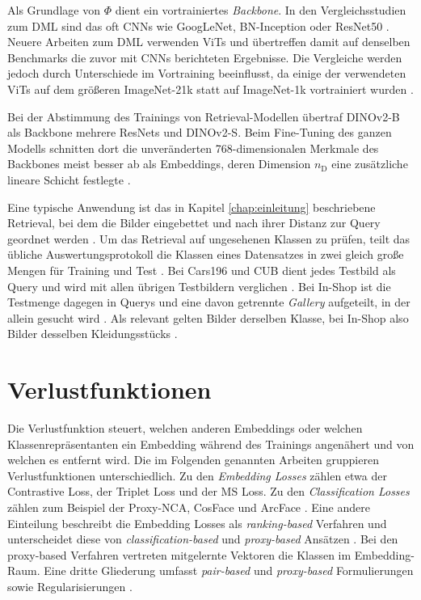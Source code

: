 Als Grundlage von $\Phi$ dient ein vortrainiertes \emph{Backbone}. In den Vergleichsstudien zum \ac{DML} sind das oft \acp{CNN} wie GoogLeNet, BN-Inception oder ResNet50 \cite{musgrave_metric_2020, roth_revisiting_2020}. Neuere Arbeiten zum \ac{DML} verwenden \acp{ViT} und übertreffen damit auf denselben Benchmarks die zuvor mit \acp{CNN} berichteten Ergebnisse. Die Vergleiche werden jedoch durch Unterschiede im Vortraining beeinflusst, da einige der verwendeten \acp{ViT} auf dem größeren ImageNet-21k statt auf ImageNet-1k vortrainiert wurden \cite{ermolov_hyperbolic_2022, ren_learning_2024}. 

Bei der Abstimmung des Trainings von Retrieval-Modellen übertraf DINOv2-B als Backbone mehrere ResNets und DINOv2-S. Beim Fine-Tuning des ganzen Modells schnitten dort die unveränderten 768-dimensionalen Merkmale des Backbones meist besser ab als Embeddings, deren Dimension $n_{\mathrm{D}}$ eine zusätzliche lineare Schicht festlegte \cite{berton_all_2025}.

Eine typische Anwendung ist das in Kapitel \ref{chap:einleitung} beschriebene Retrieval, bei dem die Bilder eingebettet und nach ihrer Distanz zur Query geordnet werden \cite{musgrave_metric_2020}. Um das Retrieval auf ungesehenen Klassen zu prüfen, teilt das übliche Auswertungsprotokoll die Klassen eines Datensatzes in zwei gleich große Mengen für Training und Test \cite{musgrave_metric_2020, song_deep_2016}. Bei Cars196 und \ac{CUB} dient jedes Testbild als Query und wird mit allen übrigen Testbildern verglichen \cite{song_deep_2016}. Bei In-Shop ist die Testmenge dagegen in Querys und eine davon getrennte \emph{Gallery} aufgeteilt, in der allein gesucht wird \cite{wang_multi-similarity_2019, kim_proxy_2020}. Als relevant gelten Bilder derselben Klasse, bei In-Shop also Bilder desselben Kleidungsstücks \cite{liu_deepfashion_2016}.

\section{Verlustfunktionen}
\label{sec:verluste}

Die Verlustfunktion steuert, welchen anderen Embeddings oder welchen Klassenrepräsentanten ein Embedding während des Trainings angenähert und von welchen es entfernt wird. Die im Folgenden genannten Arbeiten gruppieren Verlustfunktionen unterschiedlich. Zu den \emph{Embedding Losses} zählen etwa der Contrastive Loss, der Triplet Loss und der \ac{MS} Loss. Zu den \emph{Classification Losses} zählen zum Beispiel der Proxy-NCA, CosFace und ArcFace \cite{musgrave_metric_2020}. Eine andere Einteilung beschreibt die Embedding Losses als \emph{ranking-based} Verfahren und unterscheidet diese von \emph{classification-based} und \emph{proxy-based} Ansätzen \cite{roth_revisiting_2020}. Bei den proxy-based Verfahren vertreten mitgelernte Vektoren die Klassen im Embedding-Raum. Eine dritte Gliederung umfasst \emph{pair-based} und \emph{proxy-based} Formulierungen sowie Regularisierungen \cite{mohan_deep_2023}.

